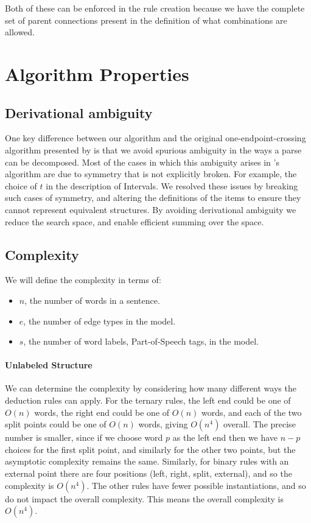Both of these can be enforced in the rule creation because we have the complete set of parent connections present in the definition of what combinations are allowed.

\section{Algorithm Properties} \label{sec:algorithm-properties}

\subsection{Derivational ambiguity}

One key difference between our algorithm and the original one-endpoint-crossing algorithm presented by \textcite{ec} is that we avoid spurious ambiguity in the ways a parse can be decomposed.
Most of the cases in which this ambiguity arises in \textcite{ec}'s algorithm are due to symmetry that is not explicitly broken.
For example, the choice of $t$ in the description of Intervals.
We resolved these issues by breaking such cases of symmetry, and altering the definitions of the items to ensure they cannot represent equivalent structures.
By avoiding derivational ambiguity we reduce the search space, and enable efficient summing over the space.

\subsection{Complexity}

We will define the complexity in terms of:

\begin{itemize}
  \item $n$, the number of words in a sentence.
  \item $e$, the number of edge types in the model.
  \item $s$, the number of word labels, \myeg Part-of-Speech tags, in the model.
\end{itemize}

\paragraph{Unlabeled Structure}
We can determine the complexity by considering how many different ways the deduction rules can apply.
For the ternary rules, the left end could be one of $O(n)$ words, the right end could be one of $O(n)$ words, and each of the two split points could be one of $O(n)$ words, giving $O(n^4)$ overall.
The precise number is smaller, since if we choose word $p$ as the left end then we have $n-p$ choices for the first split point, and similarly for the other two points, but the asymptotic complexity remains the same.
Similarly, for binary rules with an external point there are four positions (left, right, split, external), and so the complexity is $O(n^4)$.
The other rules have fewer possible instantiations, and so do not impact the overall complexity.
This means the overall complexity is $O(n^4)$.

